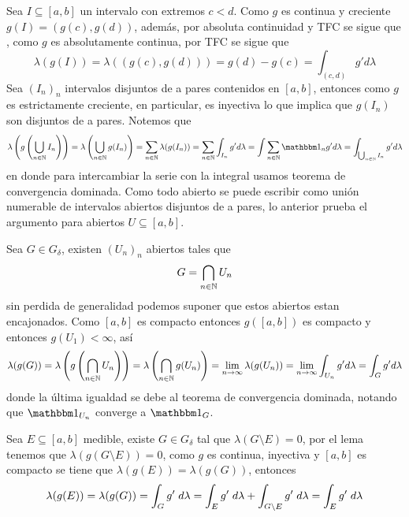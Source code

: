 \documentclass{article}
\begin{document}
\noindent Sea $I\subseteq[a,b]$ un intervalo con extremos $c<d$. Como $g$ es continua y creciente
$g(I)=(g(c),g(d))$, además, por absoluta continuidad y TFC se sigue que
, como $g$ es absolutamente continua, por TFC 
se sigue que
\begin{equation*}
    \lambda(g(I))=\lambda((g(c),g(d)))=g(d)-g(c)=\int_{(c,d)}g'd\lambda
\end{equation*}
Sea $(I_{n})_{n}$ intervalos disjuntos de a pares contenidos en $[a,b]$, entonces como $g$ es 
estrictamente creciente, en particular, es inyectiva lo que implica que $g(I_{n})$ son disjuntos 
de a pares. Notemos que
\begin{equation*}
    \lambda\left(g\left(\bigcup_{n\in\N}I_{n}\right)\right)
    =\lambda\left(\bigcup_{n\in\N}g(I_{n})\right)=\sum_{n\in\N}\lambda(g(I_{n}))
    =\sum_{n\in\N}\int_{I_{n}}g'd\lambda=\int\sum_{n\in\N}\I_{n}g'd\lambda
    =\int_{\bigcup_{n\in\N}I_{n}}g'd\lambda
\end{equation*}
en donde para intercambiar la serie con la integral usamos teorema de convergencia dominada. Como
todo abierto se puede escribir como unión numerable de intervalos abiertos disjuntos de a pares,
lo anterior prueba el argumento para abiertos $U\subseteq[a,b]$.

\vspace{2mm}
\noindent Sea $G\in G_{\delta}$, existen $(U_{n})_{n}$ abiertos tales que
\begin{equation*}
    G=\bigcap_{n\in\mathbb{N}}U_{n}
\end{equation*}
sin perdida de generalidad podemos suponer que estos abiertos estan encajonados. Como $[a,b]$ es
compacto entonces $g([a,b])$ es compacto y entonces $g(U_{1})<\infty$, así
\begin{equation*}
    \lambda(g(G))=\lambda\left(g\left(\bigcap_{n\in\mathbb{N}}U_{n}\right)\right)
    =\lambda\left(\bigcap_{n\in\mathbb{N}}g(U_{n})\right)=\lim\limits_{n\to\infty}\lambda(g(U_{n}))
    =\lim\limits_{n\to\infty}\int_{U_{n}}g'd\lambda=\int_{G}g'd\lambda
\end{equation*}
donde la última igualdad se debe al teorema de convergencia dominada, notando que $\I_{U_{n}}$ 
converge a $\I_{G}$. 

\vspace{2mm}
\noindent Sea $E\subseteq[a,b]$ medible, existe $G\in G_{\delta}$ tal que 
$\lambda(G\setminus E)=0$, por el lema tenemos que $\lambda(g(G\setminus E))=0$, como $g$ es 
continua, inyectiva y $[a,b]$ es compacto se tiene que $\lambda(g(E))=\lambda(g(G))$, entonces
\begin{equation*}
    \lambda(g(E))=\lambda(g(G))=\int_{G}g'\hspace{1mm}d\lambda=\int_{E}g'\hspace{1mm}d\lambda
    +\int_{G\setminus E}g'\hspace{1mm}d\lambda=\int_{E}g'\hspace{1mm}d\lambda
\end{equation*}


\end{document}
